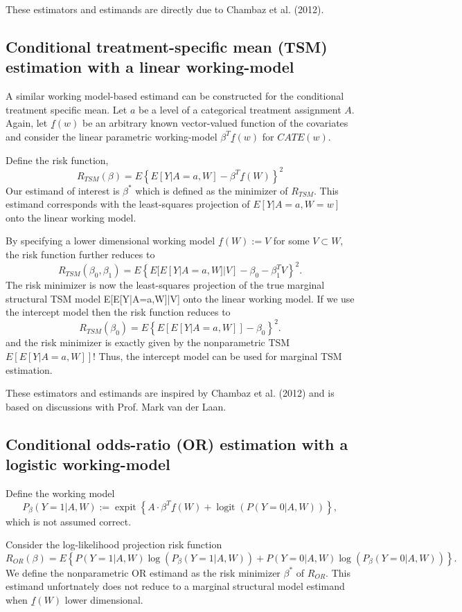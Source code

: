 \documentclass{article}
\DeclareMathOperator{\logit}{logit}
\DeclareMathOperator{\expit}{expit}
\begin{document}
These estimators and estimands are directly due to Chambaz et al. (2012).\nocite{ChambazLaanVarimp}

\subsection{Conditional treatment-specific mean (TSM) estimation with a linear working-model}
 

A similar working model-based estimand can be constructed for the conditional treatment specific mean. Let $a$ be a level of a categorical treatment assignment $A$. Again, let $\underline{f}(w)$ be an arbitrary known vector-valued function of the covariates and consider the linear parametric working-model $\beta^T \underline{f}(w)$ for $CATE(w)$. 

\noindent Define the risk function,
$$R_{TSM}(\beta) = E \left\{E[Y|A=a,W] -  \beta^T \underline{f}(W) \right\}^2$$
Our estimand of interest is $\beta^*$ which is defined as the minimizer of $R_{TSM}$. This estimand corresponds with the least-squares projection of $E[Y|A=a,W=w]$ onto the linear working model.

By specifying a lower dimensional working model $\underline{f}(W) := V$ for some $V \subset W$, the risk function further reduces to
$$R_{TSM}(\beta_0, \beta_1) = E \left\{E[E[Y|A=a,W]|V] - \beta_0 - \beta_1^T V \right\}^2.$$
The risk minimizer is now the least-squares projection of the true marginal structural TSM model E[E[Y|A=a,W]|V] onto the linear working model. If we use the intercept model then the risk function reduces to
$$R_{TSM}(\beta_0) = E \left\{E[E[Y|A=a,W]] - \beta_0  \right\}^2.$$
and the risk minimizer is exactly given by the nonparametric TSM $E[E[Y|A=a,W]]$! Thus, the intercept model can be used for marginal TSM estimation.

These estimators and estimands are inspired by Chambaz et al. (2012) and is based on discussions with Prof. Mark van der Laan.\nocite{ChambazLaanVarimp}

\subsection{Conditional odds-ratio (OR) estimation with a logistic working-model}
Define the working model
$$P_{\beta}(Y=1|A,W) := \expit\left\{A \cdot \beta^T \underline{f}(W) + \logit(P(Y=0|A,W))\right\},$$
which is not assumed correct. 

\noindent Consider the log-likelihood projection risk function
$$R_{OR}(\beta) = E \left\{P(Y=1|A,W)\log(P_{\beta}(Y=1|A,W)) + P(Y=0|A,W)\log(P_{\beta}(Y=0|A,W)) \right\}.$$
We define the nonparametric OR estimand as the risk minimizer $\beta^*$ of $R_{OR}$. This estimand unfortnately does not reduce to a marginal structural model estimand when $\underline{f}(W)$ lower dimensional.
\end{document}
